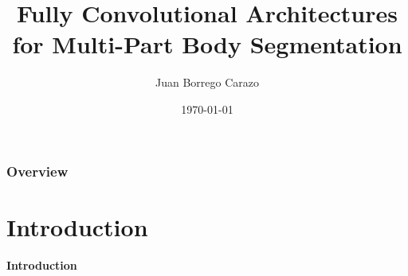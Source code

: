 \documentclass{beamer}
\title[Convolutional Networks]{Fully Convolutional Architectures for Multi-Part Body Segmentation} %
\author{Juan Borrego Carazo} %
\institute[UB] %
{
University of Barcelona \\ %
\medskip
Fundamentals of Data Science
}
\date{\today} %
\begin{document}
\begin{frame}
\titlepage %
\end{frame}

\begin{frame}
\frametitle{Overview} %
\tableofcontents %
\end{frame}


\section{Introduction} %

\begin{frame}
\huge{\centerline{\textbf{Introduction}}}
\end{frame}

\end{document}
